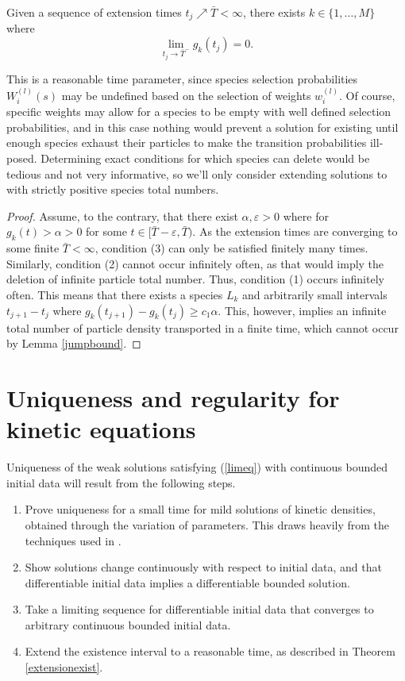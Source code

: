 \begin{theorem}\label{extensionexist}
Given a sequence of extension times $t_j\nearrow \bar T < \infty$, there exists $k \in \{1, \dots, M\}$ where 
\begin{equation}
\lim_{t_j \rightarrow \bar T^-} g_k(t_j) = 0.
\end{equation}
\end{theorem}

  This is a reasonable time parameter, since species selection probabilities $W_i^{(l)}(s)$ may be undefined based on the selection of weights $w^{(l)}_i$.  Of course, specific weights may allow for a species to be empty with well defined selection probabilities, and in this case nothing would prevent a solution for existing until enough species exhaust their particles to make the transition probabilities ill-posed. Determining exact conditions for which species can delete would be tedious and not very informative, so we'll only consider extending solutions to with strictly positive species total numbers.
\begin{proof}
Assume, to the contrary, that there exist $\alpha, \varepsilon> 0$ where for  $g_k(t)>\alpha>0$ for some $t \in [\bar T- \varepsilon, \bar T)$.   As the extension times are converging to some finite $\bar T < \infty$, condition (3) can only be satisfied finitely many times.  Similarly, condition (2) cannot occur infinitely often, as that would imply the deletion of infinite particle total number. Thus, condition (1) occurs infinitely often.   This means that there exists a species $L_k$ and arbitrarily small intervals $t_{j+1}-t_{j}$ where $g_k(t_{j+1}) -g_k(t_{j})\ge c_{1}\alpha$. This, however, implies an infinite total number of particle density transported in a finite time, which cannot occur by Lemma \ref{jumpbound}.
\end{proof}


\section{Uniqueness and regularity for kinetic equations}\label{uniquesect}
Uniqueness of the weak solutions satisfying (\ref{limeq}) with continuous bounded initial data will result from the following steps.
\begin{enumerate}
\item Prove uniqueness for a small time for mild solutions of kinetic densities, obtained through the variation of parameters.
This draws heavily from the techniques used in \cite{henselerthesis}.
\item Show solutions change continuously with respect to initial data, and that differentiable initial data implies a differentiable bounded solution.
\item Take a limiting sequence for differentiable initial data that converges to arbitrary continuous bounded initial data. 
\item Extend the existence interval to a reasonable time, as described in Theorem \ref{extensionexist}.
\end{enumerate}
